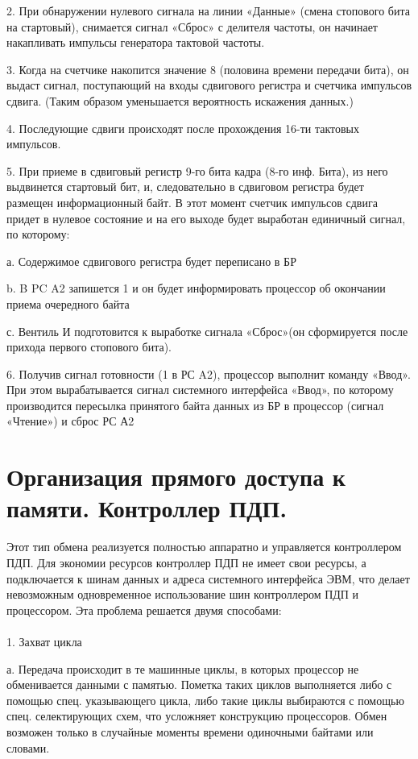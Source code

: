 \documentclass{article}
\begin{document}
2. При обнаружении нулевого сигнала на линии «Данные» (смена стопового бита на стартовый), снимается сигнал «Сброс» с делителя частоты, он начинает накапливать импульсы генератора тактовой частоты.

3. Когда на счетчике накопится значение 8 (половина времени передачи бита), он выдаст сигнал, поступающий на входы сдвигового регистра и счетчика импульсов сдвига. (Таким образом уменьшается вероятность искажения данных.)

4. Последующие сдвиги происходят после прохождения 16-ти тактовых импульсов.

5. При приеме в сдвиговый регистр 9-го бита кадра (8-го инф. Бита), из него выдвинется стартовый бит, и, следовательно в сдвиговом регистра будет размещен информационный байт. В этот момент счетчик импульсов сдвига придет в нулевое состояние и на его выходе будет выработан единичный сигнал, по которому:

а. Содержимое сдвигового регистра будет переписано в БР

b. B PC A2 запишется 1 и он будет информировать процессор об окончании приема очередного байта

с. Вентиль И подготовится к выработке сигнала «Сброс»(он сформируется после
прихода первого стопового бита).

6. Получив сигнал готовности (1 в РС A2), процессор выполнит команду «Ввод». При этом
вырабатывается сигнал системного интерфейса «Ввод», по которому производится пересылка принятого байта данных из БР в процессор (сигнал «Чтение») и сброс РС А2




\section{Организация прямого доступа к памяти. Контроллер ПДП.}
Этот тип обмена реализуется полностью аппаратно и управляется контроллером ПДП.
Для экономии ресурсов контроллер ПДП не имеет свои ресурсы, а подключается к шинам данных и адреса системного интерфейса ЭВМ, что делает невозможным одновременное использование шин контроллером ПДП и процессором.
Эта проблема решается двумя способами:
\\ \\
1. Захват цикла

а. Передача происходит в те машинные циклы, в которых процессор не обменивается данными с памятью. 
Пометка таких циклов выполняется либо с помощью спец. указывающего цикла, либо такие циклы выбираются с помощью спец. селектирующих схем, что усложняет конструкцию процессоров. 
Обмен возможен только в случайные моменты времени одиночными байтами или словами.
\end{document}
